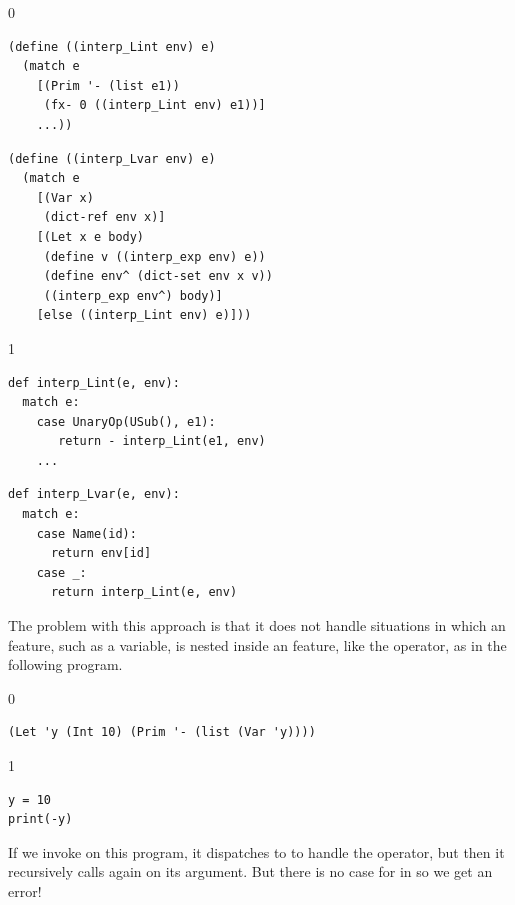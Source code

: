 \documentclass[7x10]{TimesAPriori_MIT}%
\def\racketEd{0}
\def\pythonEd{1}
\def\edition{1}
\begin{document}
\begin{center}
{\if\edition\racketEd  
\begin{minipage}{0.45\textwidth}
\begin{lstlisting}
(define ((interp_Lint env) e)
  (match e
    [(Prim '- (list e1))
     (fx- 0 ((interp_Lint env) e1))]
    ...))
\end{lstlisting}
\end{minipage}
\begin{minipage}{0.45\textwidth}
  \begin{lstlisting}
(define ((interp_Lvar env) e)
  (match e
    [(Var x)
     (dict-ref env x)]
    [(Let x e body)
     (define v ((interp_exp env) e))
     (define env^ (dict-set env x v))
     ((interp_exp env^) body)]
    [else ((interp_Lint env) e)]))    
\end{lstlisting}
\end{minipage}
\fi}

{\if\edition\pythonEd
\begin{minipage}{0.45\textwidth}
\begin{lstlisting}
def interp_Lint(e, env):
  match e:
    case UnaryOp(USub(), e1):
       return - interp_Lint(e1, env)
    ...
\end{lstlisting}
\end{minipage}
\begin{minipage}{0.45\textwidth}
\begin{lstlisting}
def interp_Lvar(e, env):
  match e:
    case Name(id):
      return env[id]
    case _:
      return interp_Lint(e, env)
\end{lstlisting}
\end{minipage}
\fi}
\end{center}
The problem with this approach is that it does not handle situations
in which an \LangVar{} feature, such as a variable, is nested inside
an \LangInt{} feature, like the \code{-} operator, as in the following
program.
%
{\if\edition\racketEd
\begin{lstlisting}
(Let 'y (Int 10) (Prim '- (list (Var 'y))))
\end{lstlisting}
\fi}
{\if\edition\pythonEd
  \begin{lstlisting}
y = 10 
print(-y)
\end{lstlisting}
\fi}
%
\noindent If we invoke  on this program, it
dispatches to  to handle the \code{-} operator, but
then it recursively calls  again on its argument.
But there is no case for  in  so we get
an error!
\end{document}

